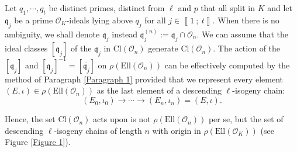 \documentclass[a4paper,10pt,notitlepage]{report}
\theoremstyle{definition}
\theoremstyle{plain}
\theoremstyle{definition}
\newcommand{\mO}{\mathcal{O}}
\renewcommand{\i}[2]{\left\llbracket #1~;~#2\right\rrbracket}
\renewcommand{\(}{\left(}
\renewcommand{\)}{\right)}
\newcommand{\mfq}{\mathfrak{q}}
\begin{document}
Let $q_1, \cdots,q_t$ be distinct primes, distinct from $\ell$ and $p$ that all split in $K$ and let $\mfq_j$ be a prime $\mO_K$-ideals lying above $q_j$ for all $j\in\i{1}{t}$.  When there is no ambiguity, we shall denote $\mfq_j$ instead $\mfq_j^{(n)}:=\mfq_j\cap\mO_n$.  We can assume that the ideal classes $[\mfq_j]$ of the $\mfq_j$ in $\mbox{Cl}(\mO_n)$ generate $\mbox{Cl}(\mO_n)$.  The action of the $[\mfq_j]$ and $[\mfq_j]^{-1}=[\overline{\mfq_j}]$ on $\rho(\mbox{Ell}(\mO_n))$ can be effectively computed by the method of Paragraph \ref{Paragraph 1} provided that we represent every element $(E,\iota)\in\rho(\mbox{Ell}(\mO_n))$ as the last element of a descending $\ell$-isogeny chain:
\[(E_0,\iota_0)\longrightarrow\cdots\longrightarrow (E_n,\iota_n)=(E,\iota).\]

Hence, the set $\mbox{Cl}(\mO_n)$ acts upon is not $\rho(\mbox{Ell}(\mO_n))$ per se, but the set of  descending $\ell$-isogeny chains of length $n$ with origin in $\rho(\mbox{Ell}(\mO_K))$ (see Figure \ref{Figure 1}).

\end{document}
